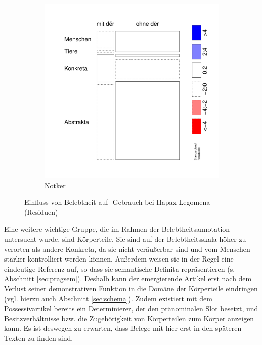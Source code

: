 \begin{figure}
\begin{subfigure}[b]{.5\linewidth}
  \includegraphics[height=.25\textheight]{generated/images/bel-hapaxe-residuals-N}
\caption {Notker}
\end{subfigure}
\caption{Einfluss von Belebtheit auf -Gebrauch bei Hapax Legomena (Residuen)}
\label{fig:bel-hapaxe-residuals}
\end{figure}

Eine weitere wichtige Gruppe, die im Rahmen der Belebtheitsannotation untersucht wurde, sind Körperteile. Sie sind auf der Belebtheitsskala höher zu verorten als andere Konkreta, da sie nicht veräußerbar sind und vom Menschen stärker kontrolliert werden können. Außerdem weisen sie in der Regel eine eindeutige Referenz auf, so dass sie semantische Definita repräsentieren (s.  Abschnitt \ref{sec:pragsem}). Deshalb kann der emergierende Artikel erst nach dem Verlust seiner demonstrativen Funktion in die Domäne der Körperteile eindringen (vgl. hierzu auch Abschnitt \ref{sec:schema}). Zudem existiert mit dem Possessivartikel bereits ein Determinierer, der den pränominalen Slot besetzt, und Besitzverhältnisse bzw. die Zugehörigkeit von Körperteilen zum Körper anzeigen kann. Es ist deswegen zu erwarten, dass Belege mit  hier erst in den späteren Texten zu finden sind. 

